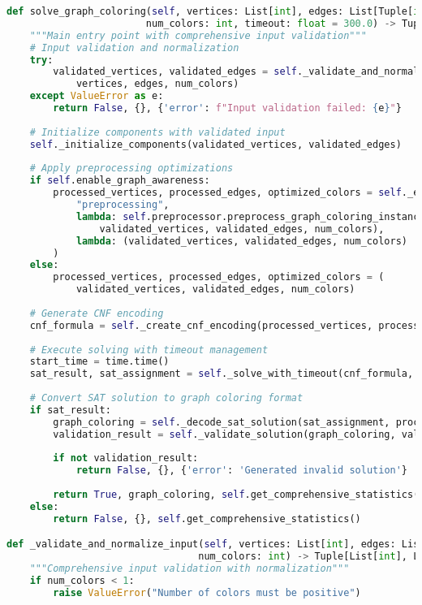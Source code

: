 \begin{lstlisting}[language=Python, caption=Flexible Graph Input Processing]
def solve_graph_coloring(self, vertices: List[int], edges: List[Tuple[int, int]], 
                        num_colors: int, timeout: float = 300.0) -> Tuple[bool, Dict[int, int], Dict]:
    """Main entry point with comprehensive input validation"""
    # Input validation and normalization
    try:
        validated_vertices, validated_edges = self._validate_and_normalize_input(
            vertices, edges, num_colors)
    except ValueError as e:
        return False, {}, {'error': f"Input validation failed: {e}"}
    
    # Initialize components with validated input
    self._initialize_components(validated_vertices, validated_edges)
    
    # Apply preprocessing optimizations
    if self.enable_graph_awareness:
        processed_vertices, processed_edges, optimized_colors = self._execute_with_fallback(
            "preprocessing", 
            lambda: self.preprocessor.preprocess_graph_coloring_instance(
                validated_vertices, validated_edges, num_colors),
            lambda: (validated_vertices, validated_edges, num_colors)
        )
    else:
        processed_vertices, processed_edges, optimized_colors = (
            validated_vertices, validated_edges, num_colors)
    
    # Generate CNF encoding
    cnf_formula = self._create_cnf_encoding(processed_vertices, processed_edges, optimized_colors)
    
    # Execute solving with timeout management
    start_time = time.time()
    sat_result, sat_assignment = self._solve_with_timeout(cnf_formula, timeout, start_time)
    
    # Convert SAT solution to graph coloring format
    if sat_result:
        graph_coloring = self._decode_sat_solution(sat_assignment, processed_vertices, optimized_colors)
        validation_result = self._validate_solution(graph_coloring, validated_edges)
        
        if not validation_result:
            return False, {}, {'error': 'Generated invalid solution'}
        
        return True, graph_coloring, self.get_comprehensive_statistics()
    else:
        return False, {}, self.get_comprehensive_statistics()

def _validate_and_normalize_input(self, vertices: List[int], edges: List[Tuple[int, int]], 
                                 num_colors: int) -> Tuple[List[int], List[Tuple[int, int]]]:
    """Comprehensive input validation with normalization"""
    if num_colors < 1:
        raise ValueError("Number of colors must be positive")
    

\end{lstlisting}
